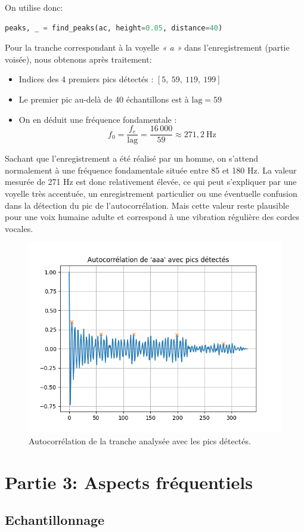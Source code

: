 On utilise donc: 

\begin{lstlisting}[language=python]
    peaks, _ = find_peaks(ac, height=0.05, distance=40)
\end{lstlisting}

Pour la tranche correspondant à la voyelle \textit{« a »} dans l’enregistrement (partie voisée), nous obtenons après traitement:

\begin{itemize}
    \item Indices des 4 premiers pics détectés : \([5,\ 59,\ 119,\ 199]\)
    \item Le premier pic au-delà de 40 échantillons est à \(\text{lag} = 59\)
    \item On en déduit une fréquence fondamentale :
    \[
    f_0 = \frac{f_e}{\text{lag}} = \frac{16\,000}{59} \approx 271{,}2\ \mathrm{Hz}
    \]
\end{itemize}

Sachant que l'enregistrement a été réalisé par un homme, on s’attend normalement à une fréquence fondamentale située entre 85 et 180 Hz. La valeur mesurée de 271 Hz est donc relativement élevée, ce qui peut s’expliquer par une voyelle très accentuée, un enregistrement particulier ou une éventuelle confusion dans la détection du pic de l’autocorrélation.
Mais cette valeur reste plausible pour une voix humaine adulte et correspond à une vibration régulière des cordes vocales.

\begin{figure}[h!]
    \centering
    \includegraphics[width=17cm]{screenshots/autocorrelation_avec_pics_detectes.png}
    \caption{Autocorrélation de la tranche analysée avec les pics détectés.}
\end{figure}

\section{Partie 3: Aspects fréquentiels}
\subsection{Echantillonnage}

